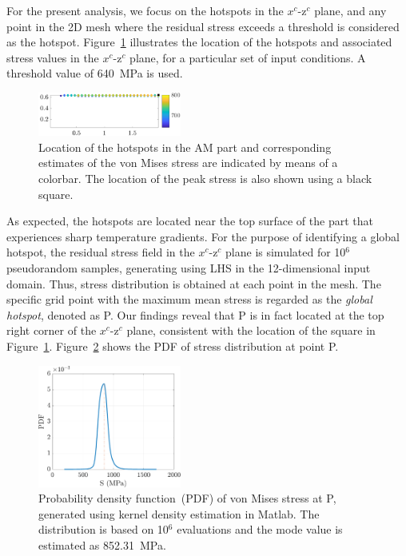 For the present analysis, we focus on the hotspots in the $x^c$-z$^c$ plane, and any point in the 2D mesh
where the residual stress exceeds a threshold is considered as the hotspot. Figure~\ref{fig:hs} illustrates the 
location of the hotspots and associated stress values in the $x^c$-z$^c$ plane, for a particular set of
input conditions. A threshold value of 640~MPa is used. 
%
\begin{figure}[htbp]
\begin{center}
\includegraphics[width=0.42\textwidth]{./Figures/loc_hotspot10}
\end{center}
\caption{Location of the hotspots in the AM part and corresponding estimates of the von Mises stress
are indicated by means of a colorbar. The location of the peak stress is also shown using a black square.}
\label{fig:hs}
\end{figure}
%
As expected, the hotspots are located near the top surface of the part that experiences sharp temperature
gradients. For the purpose of identifying a global hotspot, the residual stress
field in the $x^c$-z$^c$ plane is simulated for 10$^6$ pseudorandom samples, generating using LHS
in the 12-dimensional input domain. Thus, stress distribution is obtained at each point in the mesh. 
The specific grid point with the maximum mean stress is regarded as the \textit{global hotspot},
denoted as P. Our findings reveal that P is in fact located at the top right corner of the $x^c$-z$^c$
plane, consistent with the location of the square in Figure~\ref{fig:hs}.
Figure~\ref{fig:kde_S} shows the PDF of stress distribution at point P. 
%
\begin{figure}[htbp]
\begin{center}
\includegraphics[width=0.42\textwidth]{./Figures/kde_S_mumax}
\end{center}
\caption{Probability density function~(PDF) of von Mises stress at P, generated using kernel density estimation in 
Matlab. The distribution is based on 10$^6$ evaluations and the mode value is estimated as 852.31~MPa.}
\label{fig:kde_S}
\end{figure}

